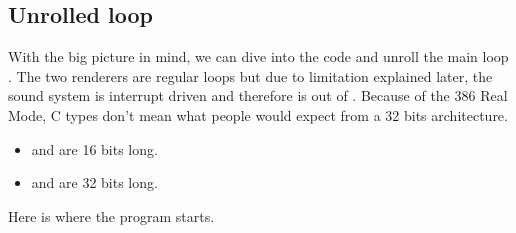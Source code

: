 \documentclass[book.tex]{subfiles}
\begin{document}
 









\subsection{Unrolled loop}
With the big picture in mind, we can dive into the code and unroll the main loop . The two renderers are regular loops but due to limitation explained later, the sound system is interrupt driven and therefore is out of . Because of the 386 Real Mode, C types don't mean what people would expect from a 32 bits architecture.\\
\begin{itemize}
\item {} and  are 16 bits long.
\item {} and  are 32 bits long.
\end{itemize}
\par
Here is where the program starts.\\
\par
\begin{minipage}{\textwidth}

\end{minipage}
\par
\end{document}
